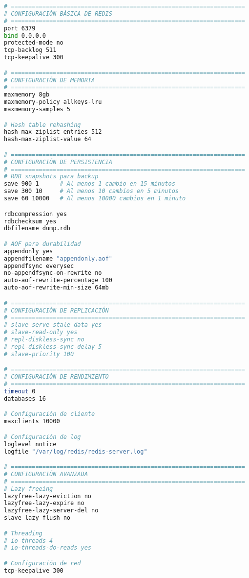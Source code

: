 \begin{lstlisting}[language=bash, caption=Configuración de Redis para Alto Rendimiento, label=lst:redis_config]
# ===================================================================
# CONFIGURACIÓN BÁSICA DE REDIS
# ===================================================================
port 6379
bind 0.0.0.0
protected-mode no
tcp-backlog 511
tcp-keepalive 300

# ===================================================================
# CONFIGURACIÓN DE MEMORIA
# ===================================================================
maxmemory 8gb
maxmemory-policy allkeys-lru
maxmemory-samples 5

# Hash table rehashing
hash-max-ziplist-entries 512
hash-max-ziplist-value 64

# ===================================================================
# CONFIGURACIÓN DE PERSISTENCIA
# ===================================================================
# RDB snapshots para backup
save 900 1      # Al menos 1 cambio en 15 minutos
save 300 10     # Al menos 10 cambios en 5 minutos  
save 60 10000   # Al menos 10000 cambios en 1 minuto

rdbcompression yes
rdbchecksum yes
dbfilename dump.rdb

# AOF para durabilidad
appendonly yes
appendfilename "appendonly.aof"
appendfsync everysec
no-appendfsync-on-rewrite no
auto-aof-rewrite-percentage 100
auto-aof-rewrite-min-size 64mb

# ===================================================================
# CONFIGURACIÓN DE REPLICACIÓN
# ===================================================================
# slave-serve-stale-data yes
# slave-read-only yes
# repl-diskless-sync no
# repl-diskless-sync-delay 5
# slave-priority 100

# ===================================================================
# CONFIGURACIÓN DE RENDIMIENTO
# ===================================================================
timeout 0
databases 16

# Configuración de cliente
maxclients 10000

# Configuración de log
loglevel notice
logfile "/var/log/redis/redis-server.log"

# ===================================================================
# CONFIGURACIÓN AVANZADA
# ===================================================================
# Lazy freeing
lazyfree-lazy-eviction no
lazyfree-lazy-expire no
lazyfree-lazy-server-del no
slave-lazy-flush no

# Threading
# io-threads 4
# io-threads-do-reads yes

# Configuración de red
tcp-keepalive 300
\end{lstlisting}

